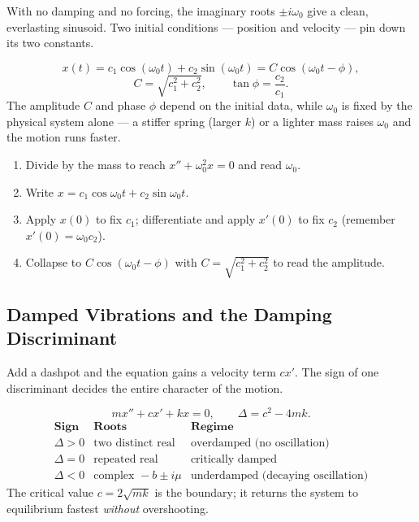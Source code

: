 With no damping and no forcing, the imaginary roots $\pm i\omega_0$ give a clean,
everlasting sinusoid. Two initial conditions --- position and velocity --- pin down
its two constants.

\begin{formulabox}
\[ x(t) = c_1 \cos(\omega_0 t) + c_2 \sin(\omega_0 t) = C\cos(\omega_0 t - \phi), \]
\[ C = \sqrt{c_1^{2} + c_2^{2}}, \qquad \tan\phi = \frac{c_2}{c_1}. \]
The amplitude $C$ and phase $\phi$ depend on the initial data, while $\omega_0$ is
fixed by the physical system alone --- a stiffer spring (larger $k$) or a lighter
mass raises $\omega_0$ and the motion runs faster.
\end{formulabox}

\begin{methodbox}
\begin{enumerate}[leftmargin=1.6em, itemsep=2pt]
    \item Divide by the mass to reach $x'' + \omega_0^{2}x = 0$ and read $\omega_0$.
    \item Write $x = c_1\cos\omega_0 t + c_2\sin\omega_0 t$.
    \item Apply $x(0)$ to fix $c_1$; differentiate and apply $x'(0)$ to fix $c_2$
          (remember $x'(0) = \omega_0 c_2$).
    \item Collapse to $C\cos(\omega_0 t - \phi)$ with $C=\sqrt{c_1^2+c_2^2}$ to read
          the amplitude.
\end{enumerate}
\end{methodbox}

\subsection{Damped Vibrations and the Damping Discriminant}

Add a dashpot and the equation gains a velocity term $c x'$. The sign of one
discriminant decides the entire character of the motion.

\begin{formulabox}
\[ m x'' + c x' + k x = 0, \qquad \Delta = c^{2} - 4mk. \]
\[
\begin{array}{l|l|l}
\textbf{Sign} & \textbf{Roots} & \textbf{Regime}\\ \hline
\Delta > 0 & \text{two distinct real} & \text{overdamped (no oscillation)}\\
\Delta = 0 & \text{repeated real} & \text{critically damped}\\
\Delta < 0 & \text{complex } -b \pm i\mu & \text{underdamped (decaying oscillation)}
\end{array}
\]
The critical value $c = 2\sqrt{mk}$ is the boundary; it returns the system to
equilibrium fastest \emph{without} overshooting.
\end{formulabox}

